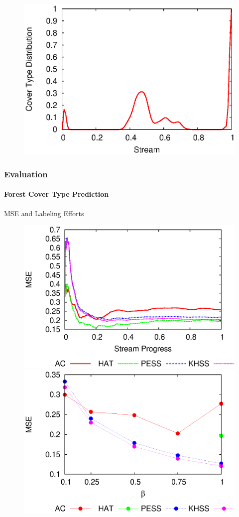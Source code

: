 \documentclass[14pt]{beamer}
\begin{document}
\begin{frame}
\begin{figure}[htp!]
\includegraphics[scale=0.3]{covtype_class_stream_3.eps}
\end{figure}

\end{frame}

\begin{frame}
\frametitle{Evaluation}
\framesubtitle{Forest Cover Type Prediction}
MSE and Labeling Efforts
\begin{figure}[htp!]
\centering
\includegraphics[scale=0.41]{covtype_mse.eps}
\includegraphics[scale=0.41]{covtype_le_mse.eps}
\end{figure}
\end{frame}
\end{document}
